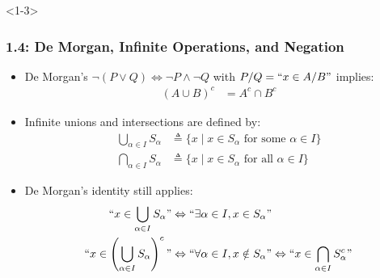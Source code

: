 \documentclass[10pt,english,aspectratio=169]{beamer}
\begin{document}
\begin{frame}<1-3> \frametitle{1.4: De Morgan, Infinite Operations, and Negation}

\begin{itemize}
\setlength\itemsep{3mm}
\item<1-> De Morgan's $\neg (P \vee Q) \Leftrightarrow \neg P \wedge \neg Q$ with $P/Q=``x\in A/B"$ implies: $\!\!\!\!\!\!\!\!\!\!\!\!$
\begin{align*}
(A \cup B)^c & = A^c \cap B^c
\end{align*}

\item<2-> Infinite unions and intersections are defined by:
  \begin{align*}
  \bigcup_{\alpha \in I} S_{\alpha}
  &\triangleq \{ x \mid x \in S_{\alpha} \text{ for some } \alpha \in I \} \\
  \bigcap_{\alpha \in I} S_{\alpha}
  &\triangleq \{ x \mid x \in S_{\alpha} \text{ for all } \alpha \in I \} 
  \end{align*}  
  
\item<3-> De Morgan's identity still applies:
  \begin{align*}
  ``x \in \bigcup_{\alpha \in I} S_{\alpha}" &\Leftrightarrow ``\exists \alpha \in I, x\in S_\alpha" \\
  ``x \in \left(\bigcup_{\alpha \in I} S_{\alpha}\right)^c" &\Leftrightarrow ``\forall \alpha \in I, x \notin S_\alpha" \Leftrightarrow ``x \in \bigcap_{\alpha \in I} S^c_{\alpha}"
  \end{align*}  
  
\end{itemize}


\end{frame}
\end{document}

